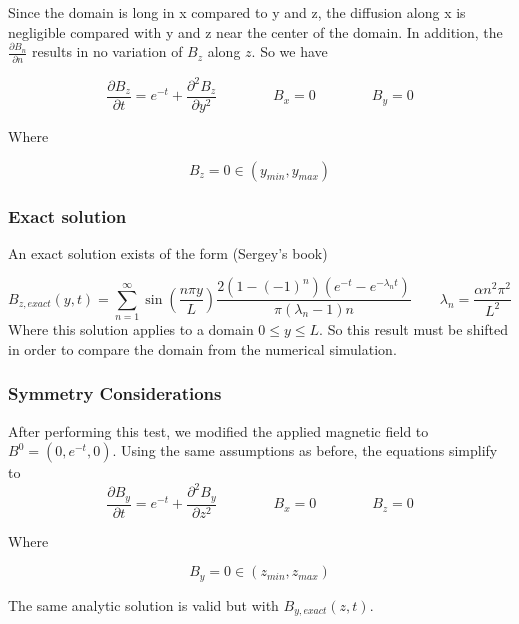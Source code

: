 \documentclass[11pt]{article}
\begin{document}
Since the domain is long in x compared to y and z, the diffusion along x is negligible compared with y and z near the center of the domain. In addition, the $\frac{\partial B_n}{\partial n}$ results in no variation of $B_z$ along $z$. So we have

\begin{equation}
	\frac{\partial B_z}{\partial t} 
	=
	e^{-t}
	+
	\frac{\partial^2 B_z}{\partial y^2} 
	\qquad \qquad
	B_x = 0
	\qquad \qquad
	B_y = 0
\end{equation}

Where

\begin{equation}
	B_z = 0
	\in (y_{min}, y_{max})
\end{equation}

\subsubsection{Exact solution}

An exact solution exists of the form (Sergey's book)

\begin{equation}
	\boxed{
	B_{z,exact}(y,t) 
	=
	\sum_{n=1}^{\infty}
	\sin \left( \frac{n\pi y}{L} \right)
	\frac{2 (1 - (-1)^n) (e^{-t}-e^{-\lambda_n t})}{\pi (\lambda_n-1)n}
	}
	\qquad
	\boxed{
	\lambda_n = \frac{\alpha n^2\pi^2}{L^2}
	}
\end{equation}
Where this solution applies to a domain $0 \le y \le L$. So this result must be shifted in order to compare the domain from the numerical simulation.

\subsubsection{Symmetry Considerations}

After performing this test, we modified the applied magnetic field to $B^0=(0,e^{-t},0)$. Using the same assumptions as before, the equations simplify to
\begin{equation}
	\frac{\partial B_y}{\partial t} 
	=
	e^{-t}
	+
	\frac{\partial^2 B_y}{\partial z^2} 
	\qquad \qquad
	B_x = 0
	\qquad \qquad
	B_z = 0
\end{equation}

Where

\begin{equation}
	B_y = 0
	\in (z_{min}, z_{max})
\end{equation}

The same analytic solution is valid but with $B_{y,exact}(z,t)$.
\end{document}
